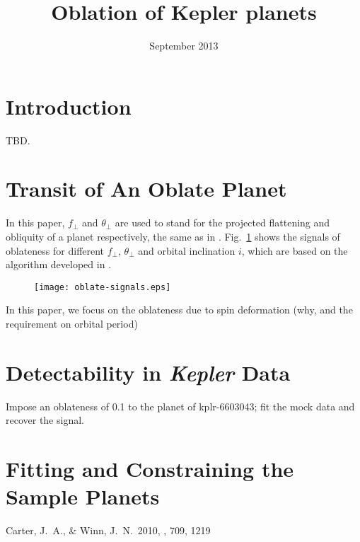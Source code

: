 \documentclass{emulateapj}
\title{Oblation of Kepler planets}
\author{}
\date{September 2013}
\begin{document}
\maketitle

\section{Introduction}

TBD.

\section{Transit of An Oblate Planet}

In this paper, $f_\perp$ and $\theta_\perp$ are used to stand for the projected flattening and obliquity of a planet respectively, the same as in \citet{Carter2010}. Fig.~\ref{oblate-signals} shows the signals of oblateness for different $f_\perp$, $\theta_\perp$ and orbital inclination $i$, which are based on the algorithm developed in \citet{Carter2010}.

\begin{figure}
\centering
\texttt{[image: oblate-signals.eps]}
\caption{} \label{oblate-signals}
\end{figure}

In this paper, we focus on the oblateness due to spin deformation (why, and the requirement on orbital period)

\section{Detectability in \textit{Kepler} Data}

Impose an oblateness of 0.1 to the planet of kplr-6603043; 
fit the mock data and recover the signal.

\section{Fitting and Constraining the Sample Planets}


\begin{thebibliography}{}
 Carter, J.~A., \& Winn, J.~N.\ 2010, \apj, 709, 1219

\end{thebibliography}
\end{document}
